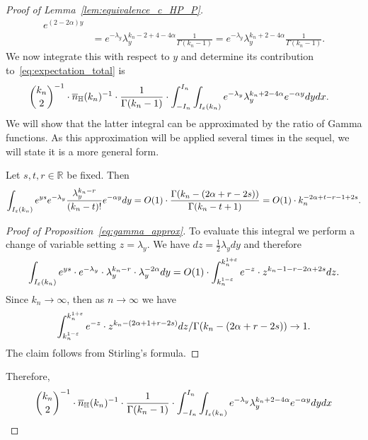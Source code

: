 \begin{proof}[Proof of Lemma~\ref{lem:equivalence_c_HP_P}]
\begin{equation}
\begin{split}
e^{(2- 2\alpha )y} \\
&=  e^{-\lambda_y} \lambda_y^{k_n-2+4-4\alpha} \frac{1}{\Gamma (k_n-1)} 
= e^{-\lambda_y} \lambda_y^{k_n+2-4\alpha} \frac{1}{\Gamma (k_n-1)}.
\end{split}
\end{equation}
We now integrate this with respect to $y$ and determine its contribution to~\eqref{eq:expectation_total} is 
\begin{equation*} 
\begin{split}
&{k_n \choose 2}^{-1} \cdot \overline{n}_{\mathbb{H}}(k_n)^{-1} \cdot 
\frac{1}{\Gamma (k_n-1)} \cdot \int_{-I_n}^{I_n} \int_{I_{\varepsilon} (k_n)} e^{-\lambda_y} \lambda_y^{k_n+2-4\alpha} e^{-\alpha y} dy dx.  
\end{split}
\end{equation*}
We will show that the latter integral can be approximated by the ratio of Gamma functions. 
As this approximation will be applied several times in the sequel, we will state it is a more 
general form.  
\begin{proposition} \label{eq:gamma_approx}
Let $s, t, r \in \mathbb{R}$ be fixed. Then 
$$\int_{I_\varepsilon (k_n)}e^{ys}
e^{-\lambda_y} \frac{\lambda_y^{k_n-r}}{(k_n-t)!}e^{-\alpha y} dy =O(1) \cdot 
\frac{\Gamma (k_n- (2\alpha +r -2s))}{\Gamma(k_n-t+1)} =O(1) \cdot 
k_n^{-2\alpha+t-r-1+ 2s}.
 $$
\end{proposition}
\begin{proof}[Proof of Proposition~\ref{eq:gamma_approx}]
To evaluate this integral we perform a change of variable setting $z=\lambda_y$. 
We have $dz =\frac{1}{2} \lambda_y dy$ and therefore 
\begin{equation} \label{eq:gamma_approx_I}
 \int_{I_\varepsilon (k_n)} e^{ys} \cdot e^{-\lambda_y} \cdot \lambda_y^{k_n-r} \cdot \lambda_y^{-2\alpha}  dy = O(1) \cdot \int_{k_n^{1-\varepsilon}}^{k_n^{1+\varepsilon}} e^{-z} \cdot z^{k_n-1-r-2\alpha+2s}  dz. 
 \end{equation}
Since $k_n\to \infty$, then as $n\to \infty$ we have 
\begin{equation} \label{eq:gamma_approx_II}
\int_{k_n^{1-\varepsilon}}^{k_n^{1+\varepsilon}} e^{-z} \cdot z^{k_n-(2\alpha+1+r-2s)}  dz / \Gamma (k_n-(2\alpha+r -2s)) \to 1.
\end{equation}
The claim follows from Stirling's formula.
\end{proof}
Therefore, 
\begin{equation*} 
\begin{split}
&{k_n \choose 2}^{-1} \cdot \expH^{-1} \cdot 
\frac{1}{\Gamma (k_n-1)} \cdot \int_{-I_n}^{I_n} \int_{I_{\eps} (k_n)} e^{-\lambda_y} \lambda_y^{k_n+2-4\alpha} e^{-\alpha y} dy dx  \\ 

\end{split}
\end{equation*}
\end{proof}
